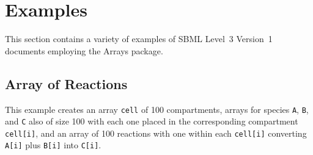 %
\section{Examples}
\label{examples}

This section contains a variety of examples of SBML Level~3 Version~1
documents employing the Arrays package.

\subsection{Array of Reactions}

This example creates an array {\tt cell} of 100 compartments, arrays for species {\tt A}, {\tt B}, and {\tt C} also of size 100 with each one placed in the corresponding compartment {\tt cell[i]}, and an array of 100 reactions with one within each {\tt cell[i]} converting {\tt A[i]} plus {\tt B[i]} into {\tt C[i]}.

